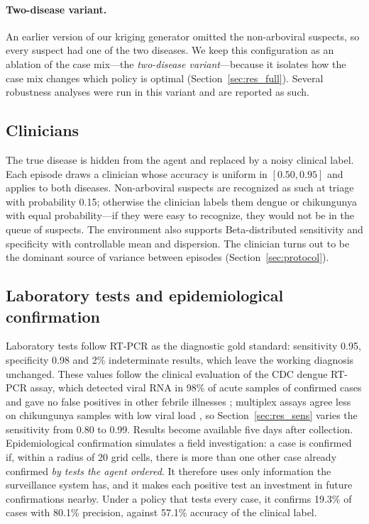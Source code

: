 \documentclass[11pt,a4paper]{article}
\begin{document}
\paragraph{Two-disease variant.} An earlier version of our kriging generator omitted the non-arboviral suspects, so every suspect had one of the two diseases. We keep this configuration as an ablation of the case mix---the \emph{two-disease variant}---because it isolates how the case mix changes which policy is optimal (Section~\ref{sec:res_full}). Several robustness analyses were run in this variant and are reported as such.

\subsection{Clinicians}
\label{subsec:clinician}

The true disease is hidden from the agent and replaced by a noisy clinical label. Each episode draws a clinician whose accuracy is uniform in $[0.50, 0.95]$ and applies to both diseases. Non-arboviral suspects are recognized as such at triage with probability 0.15; otherwise the clinician labels them dengue or chikungunya with equal probability---if they were easy to recognize, they would not be in the queue of suspects. The environment also supports Beta-distributed sensitivity and specificity with controllable mean and dispersion. The clinician turns out to be the dominant source of variance between episodes (Section~\ref{sec:protocol}).

\subsection{Laboratory tests and epidemiological confirmation}
\label{subsec:lab}

Laboratory tests follow RT-PCR as the diagnostic gold standard: sensitivity 0.95, specificity 0.98 and 2\% indeterminate results, which leave the working diagnosis unchanged. These values follow the clinical evaluation of the CDC dengue RT-PCR assay, which detected viral RNA in 98\% of acute samples of confirmed cases and gave no false positives in other febrile illnesses \cite{santiago2013cdc}; multiplex assays agree less on chikungunya samples with low viral load \cite{waggoner2016multiplex}, so Section~\ref{sec:res_sens} varies the sensitivity from 0.80 to 0.99. Results become available five days after collection. Epidemiological confirmation simulates a field investigation: a case is confirmed if, within a radius of 20 grid cells, there is more than one other case already confirmed \emph{by tests the agent ordered}. It therefore uses only information the surveillance system has, and it makes each positive test an investment in future confirmations nearby. Under a policy that tests every case, it confirms 19.3\% of cases with 80.1\% precision, against 57.1\% accuracy of the clinical label.
\end{document}
